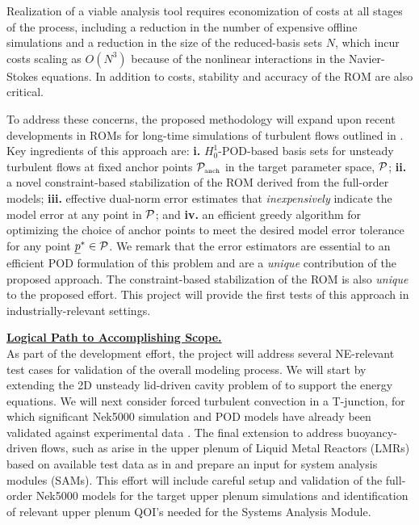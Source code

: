 {Realization of a viable analysis tool requires economization of costs at all
stages of the process, including a reduction in the number of expensive
offline simulations and a reduction in the size of the
reduced-basis sets $N$, which incur costs scaling as $O(N^3)$ because 
of the nonlinear interactions in the Navier-Stokes equations.
In addition to costs, stability and accuracy of the ROM are also critical.

  To address these concerns, the proposed methodology will expand upon recent
developments in ROMs for long-time simulations of turbulent flows outlined in
\cite{fick18}.  Key ingredients of this approach are:
 \textbf{i.} $H^1_0$-POD-based basis sets for unsteady turbulent flows
         at fixed anchor points $\mathcal{P}_{\mbox{\tiny anch}}$ in the target
         parameter space, $\mathcal{P}$;
 \textbf{ii.} a novel constraint-based stabilization of the ROM derived
          from the full-order models;
 \textbf{iii.} effective dual-norm error estimates that {\em inexpensively}
           indicate the model error at any point in $\mathcal{P}$; and
 \textbf{iv.} an efficient greedy algorithm for optimizing the choice of
          anchor points to meet the desired model error tolerance 
          for any point ${\underline p}^* \in \mathcal{P}$.
We remark that the error estimators are essential to an efficient POD
formulation of this problem and are a {\em unique} contribution of the proposed
approach.  The constraint-based stabilization of the ROM is also {\em unique}
to the proposed effort.  This project will provide the first tests of this
approach in industrially-relevant settings.   

\vspace*{.08in}\noindent \underline{\textbf{ Logical Path to Accomplishing Scope.}} \\[-2ex]

As part of the development effort, the project will address several NE-relevant
test cases for validation of the overall modeling process.  We will start by
extending the 2D unsteady lid-driven cavity problem of \cite{fick18} to support
the energy equations.  We will next consider forced turbulent convection in a
T-junction, for which significant Nek5000 simulation and POD models have
already been validated against experimental data \cite{merzari11b}.
The final extension to address buoyancy-driven flows, such as arise in
the upper plenum
of Liquid Metal Reactors (LMRs) \cite{mbd1,mbd2,mbd3} based on available test data
as in \cite{mbd4} and prepare an input for system analysis modules (SAMs).  This
effort will include careful setup and validation of the full-order Nek5000 models 
for the target upper plenum simulations and identification of relevant 
upper plenum QOI's needed for the Systems Analysis Module.
\\[-1ex]



}
